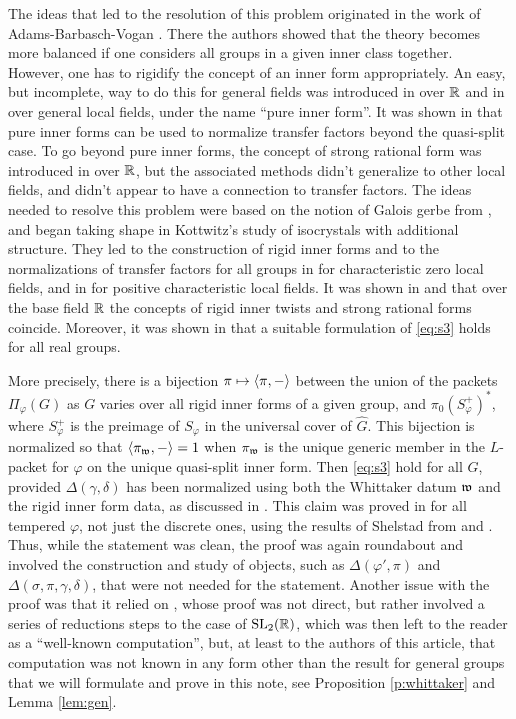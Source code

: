 \documentclass{article}
\theoremstyle{definition}
\numberwithin{equation}{section}
\renewcommand{\-}{\hyp{}}
\begin{document}
The ideas that led to the resolution of this problem originated in the work of Adams-Barbasch-Vogan \cite{ABV92}. There the authors showed that the theory becomes more balanced if one considers all groups in a given inner class together. However, one has to rigidify the concept of an inner form appropriately. An easy, but incomplete, way to do this for general fields was introduced in \cite{ABV92} over $\mathbb{R}$ and in \cite{Vog93} over general local fields, under the name ``pure inner form''. It was shown in \cite[\S2.2]{KalECI} that pure inner forms can be used to normalize transfer factors beyond the quasi-split case. To go beyond pure inner forms, the concept of strong rational form was introduced in \cite{ABV92} over $\mathbb{R}$, but the associated methods didn't generalize to other local fields, and didn't appear to have a connection to transfer factors. The ideas needed to resolve this problem were based on the notion of Galois gerbe from \cite{LR87}, and began taking shape in Kottwitz's study \cite{Kot97} of isocrystals with additional structure. They led to the construction of rigid inner forms and to the normalizations of transfer factors for all groups in \cite{KalRI} for characteristic zero local fields, and in \cite{Dillery20} for positive characteristic local fields. It was shown in \cite[\S5.2]{KalRI} and that over the base field $\mathbb{R}$ the concepts of rigid inner twists and strong rational forms coincide. Moreover, it was shown in \cite[\S5.6]{KalRI} that a suitable formulation of \eqref{eq:s3} holds for all real groups. 

More precisely, there is a bijection $\pi \mapsto \langle\pi,-\rangle$ between the union of the packets $\Pi_\varphi(G)$ as $G$ varies over all rigid inner forms of a given group, and $\pi_0(S_\varphi^+)^*$, where $S_\varphi^+$ is the preimage of $S_\varphi$ in the universal cover of $\hat G$. This bijection is normalized so that $\langle\pi_{\mathfrak{w}},-\rangle=1$ when $\pi_{\mathfrak{w}}$ is the unique generic member in the $L$\-packet for $\varphi$ on the unique quasi-split inner form. Then \eqref{eq:s3} hold for all $G$, provided $\Delta(\gamma,\delta)$ has been normalized using both the Whittaker datum $\mathfrak{w}$ and the rigid inner form data, as discussed in \cite[\S5.3]{KalRI}. This claim was proved in \cite[\S5.6]{KalRI} for all tempered $\varphi$, not just the discrete ones, using the results of Shelstad from \cite{SheTE2} and \cite{SheTE3}. Thus, while the statement was clean, the proof was again roundabout and involved the construction and study of objects, such as $\Delta(\varphi',\pi)$ and $\Delta(\sigma,\pi,\gamma,\delta)$, that were not needed for the statement. Another issue with the proof was that it relied on \cite[Theorem 11.5]{SheTE3}, whose proof was not direct, but rather involved a series of reductions steps to the case of $\textrm{SL}_2(\mathbb{R})$, which was then left to the reader as a ``well-known computation'', but, at least to the authors of this article, that computation was not known in any form other than the result for general groups that we will formulate and prove in this note, see Proposition \ref{p:whittaker} and Lemma \ref{lem:gen}.
\end{document}
